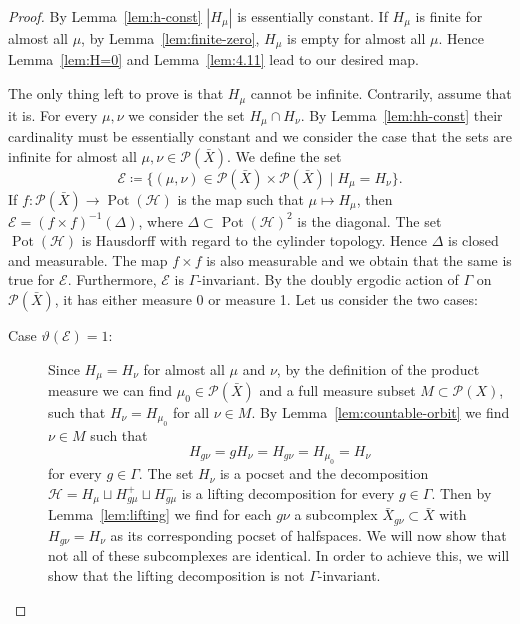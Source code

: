 \begin{proof}
  By Lemma~\ref{lem:h-const} \(|H_\mu|\) is essentially constant.
  If \(H_\mu\) is finite for almost all \(\mu\), by Lemma~\ref{lem:finite-zero}, \(H_\mu\) is empty for almost all \(\mu\). Hence Lemma~\ref{lem:H=0} and Lemma~\ref{lem:4.11} lead to our desired map.

  The only thing left to prove is that \(H_\mu\) cannot be infinite. Contrarily, assume that it is. For every \(\mu, \nu\) we consider the set \(H_\mu \cap H_\nu\). By Lemma~\ref{lem:hh-const} their cardinality must be essentially constant and we consider the case that the sets are infinite for almost all \(\mu, \nu \in \mathcal{P}(\bar X)\).
  We define the set
  \[
    \mathcal{E} \coloneqq \{(\mu, \nu) \in \mathcal{P}(\bar X) \times \mathcal{P}(\bar X)\mid H_\mu = H_\nu\}.
  \]
  If \(f\colon \mathcal{P}(\bar X) \to \operatorname{Pot}(\mathcal{H})\) is the map such that  \(\mu \mapsto H_\mu\), then \(\mathcal{E} = (f \times f)^{-1}(\Delta)\), where \(\Delta \subset \operatorname{Pot}(\mathcal{H})^2\) is the diagonal. The set \(\operatorname{Pot}(\mathcal{H})\) is Hausdorff with regard to the cylinder topology. Hence \(\Delta\) is closed and measurable. The map \(f \times f\) is also measurable and we obtain that the same is true for \(\mathcal{E}\). Furthermore, \(\mathcal{E}\) is \(\Gamma\)-invariant.  By the doubly ergodic action of \(\Gamma\) on \(\mathcal{P}(\bar X)\), it has either measure 0 or measure 1. Let us consider the two cases:
  \begin{description}
  \item[Case \(\vartheta(\mathcal{E})=1\):] Since \(H_\mu = H_\nu\) for almost all \(\mu\) and \(\nu\), by the definition of the product measure we can find \(\mu_0 \in \mathcal{P}(\bar X)\) and a full measure subset \(M \subset \mathcal{P}(X)\), such that \(H_\nu = H_{\mu_0}\) for all \(\nu \in M\). By Lemma~\ref{lem:countable-orbit} we find \(\nu \in M\) such that
    \[
      H_{g\nu} = gH_\nu = H_{g\nu} = H_{\mu_0} = H_\nu
    \]
    for every \(g \in \Gamma\). The set \(H_\nu\) is a pocset and the decomposition \(\mathcal{H} = H_\mu \sqcup H_{g\mu}^+ \sqcup H_{g\mu}^-\) is a lifting decomposition for every \(g \in \Gamma\). Then by Lemma~\ref{lem:lifting} we find for each \(g\nu\) a subcomplex \(\bar X_{g\nu} \subset \bar X\) with \(H_{g\nu} = H_\nu\) as its corresponding pocset of halfspaces. We will now show that not all of these subcomplexes are identical. In order to achieve this, we will show that the lifting decomposition is not \(\Gamma\)-invariant.


\end{description}
\end{proof}

